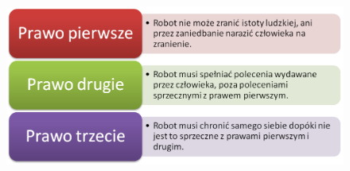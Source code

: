\begin{figure}[!h]
 \centering
 \includegraphics[height=67mm]{../images/ch01/assimov_laws.png}
 
 \label{fig:Assimov_Laws}
\end{figure}

